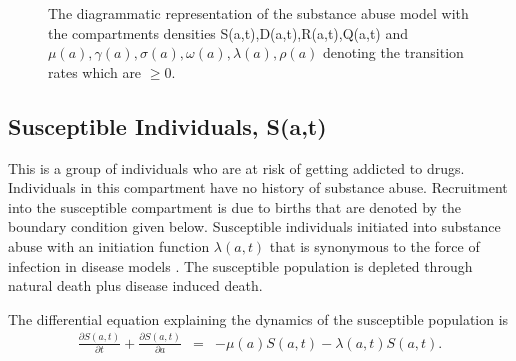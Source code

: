 \begin{figure}[h!]
\caption{The diagrammatic representation of the substance abuse model with the compartments densities S(a,t),D(a,t),R(a,t),Q(a,t) and $\mu(a), \gamma(a), \sigma(a), \omega(a), \lambda(a), \rho(a)$ denoting the transition rates which are $\geq 0.$\label{diagram}}  
\end{figure}

\subsection{Susceptible Individuals, S(a,t)}
This is a group of individuals who are at risk of getting addicted to drugs. Individuals in this compartment have no history of substance abuse. Recruitment  into the susceptible compartment is due to births that are denoted by the boundary condition given below. Susceptible individuals initiated into substance abuse with an initiation function $\lambda(a,t)$ that is synonymous to the force of infection in disease models . The susceptible population is depleted through natural death plus disease induced death.

The differential equation explaining the dynamics of the susceptible population is
 \begin{eqnarray}\label{inovation}
 \frac{\partial S(a,t)}{ \partial t}+ \frac{\partial S(a,t)}{\partial a} & = & -\mu(a) S(a,t) -\lambda(a,t)S(a,t). 
 \end{eqnarray}


